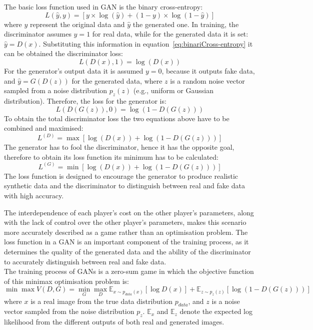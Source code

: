 \noindent The basic loss function used in GAN is the binary cross-entropy:
\begin{equation}
\label{eq:binariCross-entropy}
L(\hat{y}, y) = [y \times \log (\hat{y}) + (1-y)\times \log (1-\hat{y})]
\end{equation}
where $y$ represent the original data and $\hat{y}$ the generated one. In training, the discriminator assumes $y=1$ for real data, while for the generated data it is set: $\hat{y} = D(x)$. Substituting this information in equation~\ref{eq:binariCross-entropy} it can be obtained the discriminator loss: 
\begin{equation}
    L(D(x),1)=\log(D(x))
\end{equation}
For the generator's output data it is assumed $y = 0$, because it outputs fake data, and $\hat{y} = G(D(z))$ for the generated data, where $z$ is a random noise vector sampled from a noise distribution $p_z(z)$ (e.g., uniform or Gaussian distribution). Therefore, the loss for the generator is:
\begin{equation}
    L(D(G(z)),0) = \log(1 - D(G(z)))
\end{equation}
To obtain the total discriminator loss the two equations above have to be combined and maximised:
\begin{equation}
L^{(D)}=\max [\log (D(x)) + \log(1-D(G(z)))]
\end{equation}
The generator has to fool the discriminator, hence it has the opposite goal, therefore to obtain its loss function its minimum has to be calculated:
\begin{equation}
L^{(G)}=\min [\log (D(x)) + \log(1-D(G(z)))]
\end{equation}
The loss function is designed to encourage the generator to produce realistic synthetic data and the discriminator to distinguish between real and fake data with high accuracy.

\noindent The interdependence of each player's cost on the other player's parameters, along with the lack of control over the other player's parameters, makes this scenario more accurately described as a game rather than an optimisation problem. 
The loss function in a GAN is an important component of the training process, as it determines the quality of the generated data and the ability of the discriminator to accurately distinguish between real and fake data. 
\\
\noindent The training process of GANs is a zero-sum game in which the objective function of this minimax optimisation problem is:
\begin{equation}
\label{eq:minimax obj function}
    \min \max V(D,G) = \min_G \max_D \mathbb{E}_{x \sim p_{data}(x)}[\log D(x)]+\mathbb{E}_{z \sim p_z(z)}[\log (1- D(G(z)))]
\end{equation}
where $x$ is a real image from the true data distribution $p_{data}$, and $z$ is a noise vector sampled from the noise distribution $p_z$. $\mathbb{E}_x$ and $\mathbb{E}_z$ denote the expected log likelihood from the different outputs of both real and generated images.


